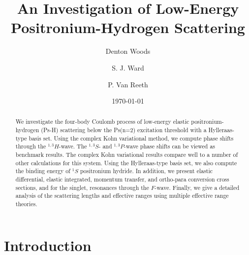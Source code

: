 \documentclass[preprint,showpacs,showkeys,preprintnumbers,amsmath,amssymb,longbibliography,pra,aps]{revtex4-1}
\begin{document}

\title{An Investigation of Low-Energy Positronium-Hydrogen Scattering}

\author{Denton Woods}

\author{S. J. Ward}

\author{P. Van Reeth}

\date{\today}

\begin{abstract}
We investigate the four-body Coulomb process of low-energy elastic
positronium-hydrogen (Ps-H) scattering below the Ps(n=2) excitation threshold
with a Hylleraas-type basis set. Using the complex Kohn variational method, we 
compute phase shifts through the $^{1,3}H$-wave. The $^{1,3}S$- and
$^{1,3}P$-wave phase shifts can be viewed as benchmark results. The complex
Kohn variational results compare well to a number of other calculations for 
this system. Using the Hylleraas-type basis set, we also compute the binding 
energy of $^1S$ positronium hydride. In addition, we present elastic 
differential, elastic integrated, momentum transfer, and ortho-para 
conversion cross sections, and for the singlet, resonances through the
$F$-wave. Finally, we give a detailed analysis of the scattering lengths
and effective ranges using multiple effective range theories.
\end{abstract}

   
\maketitle

\section{\label{sec:Intro}\protect Introduction}


\end{document}
